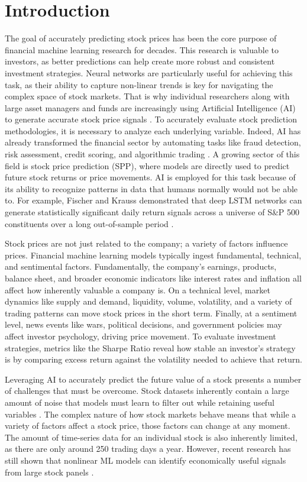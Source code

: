 \documentclass[12pt]{article}
\begin{document}
\section{Introduction}
The goal of accurately predicting stock prices has been the core purpose of financial machine learning research for decades. This research is valuable to investors, as better predictions can help create more robust and consistent investment strategies. Neural networks are particularly useful for achieving this task, as their ability to capture non-linear trends is key for navigating the complex space of stock markets. That is why individual researchers along with large asset managers and funds are increasingly using Artificial Intelligence (AI) to generate accurate stock price signals \cite{fischer2018,gkx2020}. To accurately evaluate stock prediction methodologies, it is necessary to analyze each underlying variable. Indeed, AI has already transformed the financial sector by automating tasks like fraud detection, risk assessment, credit scoring, and algorithmic trading \cite{lopez2018}. A growing sector of this field is stock price prediction (SPP), where models are directly used to predict future stock returns or price movements. AI is employed for this task because of its ability to recognize patterns in data that humans normally would not be able to. For example, Fischer and Krauss demonstrated that deep LSTM networks can generate statistically significant daily return signals across a universe of S\&P 500 constituents over a long out-of-sample period \cite{fischer2018}.

Stock prices are not just related to the company; a variety of factors influence prices. Financial machine learning models typically ingest fundamental, technical, and sentimental factors. Fundamentally, the company's earnings, products, balance sheet, and broader economic indicators like interest rates and inflation all affect how inherently valuable a company is. On a technical level, market dynamics like supply and demand, liquidity, volume, volatility, and a variety of trading patterns can move stock prices in the short term. Finally, at a sentiment level, news events like wars, political decisions, and government policies may affect investor psychology, driving price movement. To evaluate investment strategies, metrics like the Sharpe Ratio reveal how stable an investor's strategy is by comparing excess return against the volatility needed to achieve that return.

Leveraging AI to accurately predict the future value of a stock presents a number of challenges that must be overcome. Stock datasets inherently contain a large amount of noise that models must learn to filter out while retaining useful variables \cite{harvey2016}. The complex nature of how stock markets behave means that while a variety of factors affect a stock price, those factors can change at any moment. The amount of time-series data for an individual stock is also inherently limited, as there are only around 250 trading days a year. However, recent research has still shown that nonlinear ML models can identify economically useful signals from large stock panels \cite{fischer2018,gkx2020}.
\end{document}
